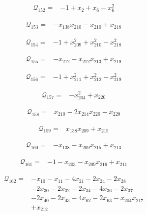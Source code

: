 \begin{align*}
\mathcal{Q}_{152}={}&-1+x_{2}+x_{6}-x_{6}^{2}
\end{align*}

\begin{align*}
\mathcal{Q}_{153}={}&-x_{138}x_{210}-x_{210}+x_{218}
\end{align*}

\begin{align*}
\mathcal{Q}_{154}={}&-1+x_{209}^{2}+x_{210}^{2}-x_{218}^{2}
\end{align*}

\begin{align*}
\mathcal{Q}_{155}={}&-x_{212}-x_{212}x_{213}+x_{219}
\end{align*}

\begin{align*}
\mathcal{Q}_{156}={}&-1+x_{211}^{2}+x_{212}^{2}-x_{219}^{2}
\end{align*}

\begin{align*}
\mathcal{Q}_{157}={}&-x_{204}^{2}+x_{220}
\end{align*}

\begin{align*}
\mathcal{Q}_{158}={}&x_{210}-2x_{214}x_{220}-x_{220}
\end{align*}

\begin{align*}
\mathcal{Q}_{159}={}&x_{138}x_{209}+x_{215}
\end{align*}

\begin{align*}
\mathcal{Q}_{160}={}&-x_{138}-x_{209}x_{215}+x_{213}
\end{align*}

\begin{align*}
\mathcal{Q}_{161}={}&-1-x_{203}-x_{209}x_{216}+x_{211}
\end{align*}

\begin{align*}
\mathcal{Q}_{162}={}&-x_{10}-x_{11}-4x_{21}-2x_{24}-2x_{28}\\
&-2x_{30}-2x_{32}-2x_{34}-4x_{36}-2x_{37}\\
&-2x_{40}-2x_{43}-4x_{62}-2x_{63}-x_{204}x_{217}\\
&+x_{212}
\end{align*}

